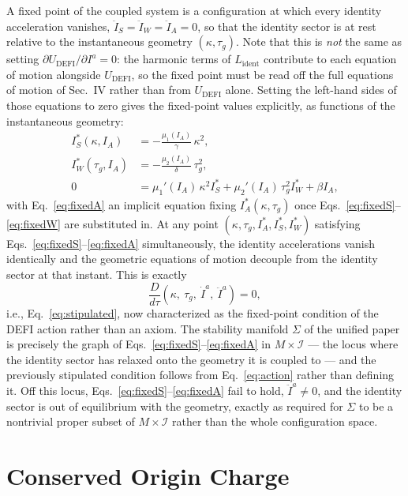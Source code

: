 \documentclass[aip,jmp,reprint,onecolumn,nofootinbib]{revtex4-2}
\begin{document}
A fixed point of the coupled system is a configuration at which every identity
acceleration vanishes, $\ddot I_S=\ddot I_W=\ddot I_A=0$, so that the identity
sector is at rest relative to the instantaneous geometry $(\kappa,\tau_g)$. Note
that this is \emph{not} the same as setting $\partial U_{\text{DEFI}}/\partial
I^a=0$: the harmonic terms of $L_{\text{ident}}$ contribute to each equation of
motion alongside $U_{\text{DEFI}}$, so the fixed point must be read off the full
equations of motion of Sec.~IV rather than from $U_{\text{DEFI}}$ alone. Setting
the left-hand sides of those equations to zero gives the fixed-point values
explicitly, as functions of the instantaneous geometry:
\begin{align}
I_S^\ast(\kappa,I_A) &= -\frac{\mu_1(I_A)}{\gamma}\,\kappa^2,
\label{eq:fixedS}\\
I_W^\ast(\tau_g,I_A) &= -\frac{\mu_2(I_A)}{\delta}\,\tau_g^2,
\label{eq:fixedW}\\
0 &= \mu_1'(I_A)\,\kappa^2 I_S^\ast + \mu_2'(I_A)\,\tau_g^2 I_W^\ast + \beta I_A,
\label{eq:fixedA}
\end{align}
with Eq.~\eqref{eq:fixedA} an implicit equation fixing $I_A^\ast(\kappa,\tau_g)$
once Eqs.~\eqref{eq:fixedS}--\eqref{eq:fixedW} are substituted in. At any point
$(\kappa,\tau_g,I_A^\ast,I_S^\ast,I_W^\ast)$ satisfying
Eqs.~\eqref{eq:fixedS}--\eqref{eq:fixedA} simultaneously, the identity
accelerations vanish identically and the geometric equations of motion decouple
from the identity sector at that instant. This is exactly
\begin{equation}
\frac{D}{d\tau}\left(\kappa,\ \tau_g,\ \dot I^a,\ \ddot I^a\right) = 0,
\end{equation}
i.e., Eq.~\eqref{eq:stipulated}, now characterized as the fixed-point condition
of the DEFI action rather than an axiom. The stability manifold $\Sigma$ of the
unified paper \cite{DuttonUnified2026} is precisely the graph of
Eqs.~\eqref{eq:fixedS}--\eqref{eq:fixedA} in $M\times\mathcal{I}$ — the locus
where the identity sector has relaxed onto the geometry it is coupled to — and
the previously stipulated condition follows from Eq.~\eqref{eq:action} rather
than defining it. Off this locus, Eqs.~\eqref{eq:fixedS}--\eqref{eq:fixedA} fail
to hold, $\ddot I^a\neq0$, and the identity sector is out of equilibrium with the
geometry, exactly as required for $\Sigma$ to be a nontrivial proper subset of
$M\times\mathcal{I}$ rather than the whole configuration space.

\section{Conserved Origin Charge}
\label{sec:origin}
\end{document}
